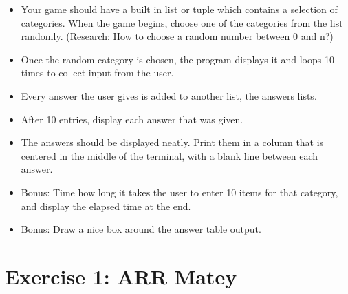 \documentclass{42-en}
\begin{document}
\begin{itemize}
	\item Your game should have a built in list or tuple which contains a selection of categories. When the game begins, choose one of the categories from the list randomly. (Research: How to choose a random number between 0 and n?)
	\item Once the random category is chosen, the program displays it and loops 10 times to collect input from the user.
	\item Every answer the user gives is added to another list, the answers lists.
	\item After 10 entries, display each answer that was given.
	\item The answers should be displayed neatly. Print them in a column that is centered in the middle of the terminal, with a blank line between each answer.
	\item Bonus: Time how long it takes the user to enter 10 items for that category, and display the elapsed time at the end.
	\item Bonus: Draw a nice box around the answer table output.
\end{itemize}

\nextexercice
\newpage


\chapter{Exercise 1: ARR Matey}
\makeheaderfiles
\end{document}
